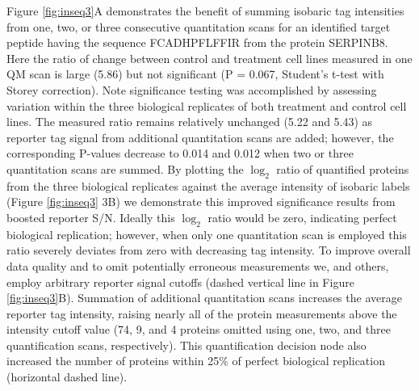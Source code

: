 Figure \ref{fig:inseq3}A demonstrates the benefit of summing isobaric tag intensities from one, two, or three consecutive quantitation scans for an \inseq{} identified target peptide having the sequence FCADHPFLFFIR from the protein SERPINB8. Here the ratio of change between control and treatment cell lines measured in one QM scan is large (5.86) but not significant (P = 0.067, Student's t-test with Storey correction).\cite{storey} Note significance testing was accomplished by assessing variation within the three biological replicates of both treatment and control cell lines. The measured ratio remains relatively unchanged (5.22 and 5.43) as reporter tag signal from additional quantitation scans are added; however, the corresponding P-values decrease to 0.014 and 0.012 when two or three quantitation scans are summed. By plotting the $\log_2$ ratio of quantified proteins from the three biological replicates against the average intensity of isobaric labels (Figure \ref{fig:inseq3} 3B) we demonstrate this improved significance results from boosted reporter S/N. Ideally this $\log_2$ ratio would be zero, indicating perfect biological replication; however, when only one quantitation scan is employed this ratio severely deviates from zero with decreasing tag intensity. To improve overall data quality and to omit potentially erroneous measurements we, and others, employ arbitrary reporter signal cutoffs (dashed vertical line in Figure \ref{fig:inseq3}B). Summation of additional quantitation scans increases the average reporter tag intensity, raising nearly all of the protein measurements above the intensity cutoff value (74, 9, and 4 proteins omitted using one, two, and three quantification scans, respectively). This quantification decision node also increased the number of proteins within 25\% of perfect biological replication (horizontal dashed line).

